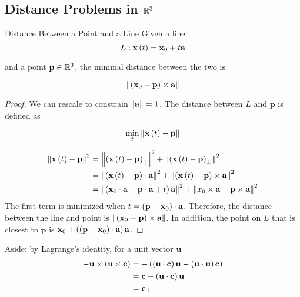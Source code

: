 \documentclass[11pt]{article}
\begin{document}
\subsection{Distance Problems in $\mathbb R^3$}



\begin{theorem}{Distance Between a Point and a Line}
  Given a line
  $$
  L: \textbf{x} \left ( t \right) = \textbf{x}_0 + t \textbf{a}
  $$
  
  and a point $\textbf{p} \in \mathbb R^3$, the minimal distance between the two is
  
  $$
  \left\lVert\left ( \textbf{x}_0 - \textbf{p} \right) \times \textbf{a}\right\rVert
  $$

  \begin{proof}
    
    We can rescale to constrain $\left\lVert\textbf{a}\right\rVert = 1$.
    The distance between $L$ and $\bm{p}$ is defined as
    
    $$
    \min_{t} \left\lVert\textbf{x} \left ( t \right) - \textbf{p}\right\rVert
    $$
    
    \begin{align*}
      \left\lVert\textbf{x} \left ( t \right) - \textbf{p}\right\rVert^2 &= \left\lVert\left ( \textbf{x} \left ( t \right) - \textbf{p} \right)_{\parallel}\right\rVert^2 + \left\lVert\left ( \textbf{x} \left ( t \right) - \textbf{p} \right)_{\perp}\right\rVert^2 \\
                                        &= \left\lVert\left ( \textbf{x} \left ( t \right) - \textbf{p} \right) \cdot \textbf{a}\right\rVert^2 + \left\lVert\left ( \textbf{x} \left ( t \right) - \textbf{p} \right) \times \textbf{a}\right\rVert^2 \\
                                        &= \left\lVert\left ( \textbf{x}_0 \cdot \textbf{a} - \textbf{p} \cdot \textbf{a} + t \right) \textbf{a}\right\rVert^2 + \left\lVert x_0 \times \textbf{a} - \textbf{p} \times \textbf{a}\right\rVert^2 \\
    \end{align*}
    The first term is minimized when $t = \left ( \textbf{p} - \textbf{x}_0 \right) \cdot \textbf{a}$.
    Therefore, the distance between the line and point is $\left\lVert\left ( \textbf{x}_0 - \textbf{p} \right) \times \textbf{a}\right\rVert$.
    In addition, the point on $L$ that is closest to $\bm{p}$ is $\textbf{x}_0 + \left ( \left ( \textbf{p} - \textbf{x}_0 \right) \cdot \textbf{a} \right) \textbf{a}$.
  \end{proof}
  Aside:
  by Lagrange's identity, for a unit vector $\bm{u}$
  \begin{align*}
    - \textbf{u} \times \left ( \textbf{u} \times \textbf{c} \right) &= - \left ( \left ( \textbf{u} \cdot \textbf{c} \right) \textbf{u} - \left ( \textbf{u} \cdot \textbf{u} \right) \textbf{c} \right) \\
                                                &= \textbf{c} - \left ( \textbf{u} \cdot \textbf{c} \right) \textbf{u} \\
                                                &= \textbf{c}_{\perp} \\
  \end{align*}
  
\end{theorem}
\end{document}
